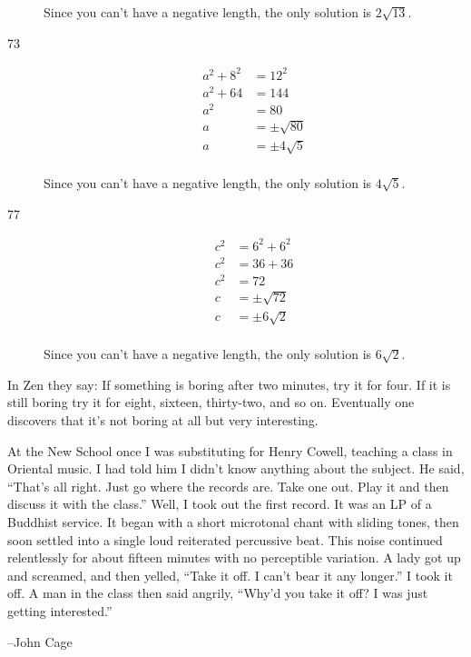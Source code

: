 \documentclass[fleqn,addpoints]{exam}
\begin{document}
\begin{description}
Since you can't have a negative length, the only solution is $2 \sqrt{13}$.

\item[73]
\begin{align*}
  a^2 + 8^2 &= 12^2 \\
  a^2 + 64 &= 144 \\
  a^2 &= 80 \\
  a &= \pm \sqrt{80} \\
  a &= \pm 4 \sqrt{5} \\
\end{align*}

Since you can't have a negative length, the only solution is $4 \sqrt{5}$.

\item[77]
\begin{align*}
  c^2 &= 6^2 + 6^2 \\
  c^2 &= 36 + 36 \\
  c^2 &= 72 \\
  c   &= \pm \sqrt{72} \\
  c   &= \pm 6 \sqrt{2} \\
\end{align*}

Since you can't have a negative length, the only solution is $6 \sqrt{2}$.

\end{description}

\else
\vspace{3 in}

\begin{em}
In Zen they say:  If something is boring after two minutes, try it for four.  If it is still boring try it for
eight, sixteen, thirty-two, and so on.  Eventually one discovers that it's not boring at all but very interesting.

\vspace{6 pt}

At the New School once I was substituting for Henry Cowell, teaching a class in Oriental music.  I had told him I didn't
know anything about the subject.  He said, ``That's all right.  Just go where the records are.  Take one out.  Play it
and then discuss it with the class.''  Well, I took out the first record.  It was an LP  of a Buddhist service.  It
began with a short microtonal chant with sliding tones, then soon settled into a single loud reiterated percussive
beat.  This noise continued relentlessly for about fifteen minutes with no perceptible variation.  A lady got up and
screamed, and then yelled, ``Take it off.  I can't bear it any longer.''  I took it off.  A man in the class then said
angrily, ``Why'd you take it off?  I was just getting interested.''

\end{em}

\vspace{0.1 in}
\hspace{0.5 in} --John Cage

\fi
\end{document}
